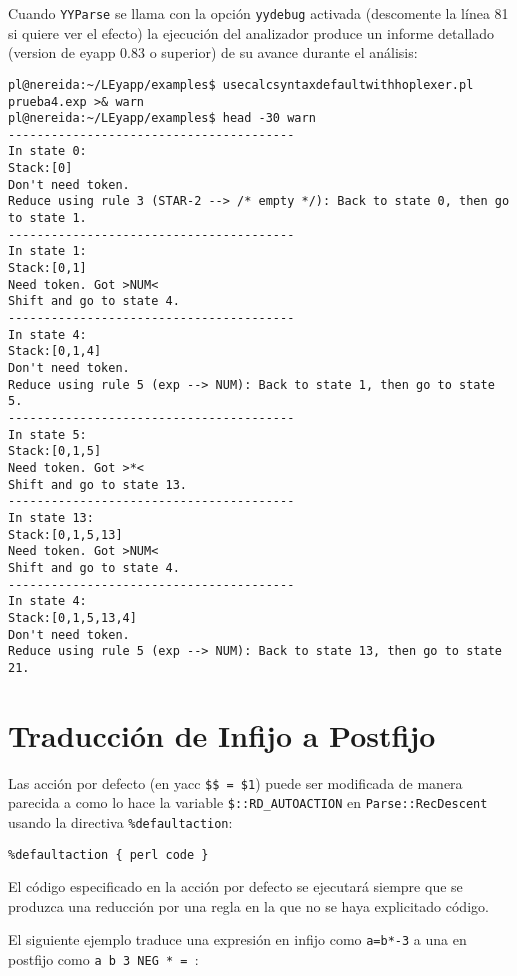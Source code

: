 
Cuando \verb|YYParse| se llama con la opción \verb|yydebug| activada 
(descomente la línea 81 si quiere ver el efecto) la ejecución
del analizador produce un informe detallado (version de eyapp 0.83 o superior)
de su avance durante el análisis:

\begin{verbatim}
pl@nereida:~/LEyapp/examples$ usecalcsyntaxdefaultwithhoplexer.pl prueba4.exp >& warn
pl@nereida:~/LEyapp/examples$ head -30 warn
----------------------------------------
In state 0:
Stack:[0]
Don't need token.
Reduce using rule 3 (STAR-2 --> /* empty */): Back to state 0, then go to state 1.
----------------------------------------
In state 1:
Stack:[0,1]
Need token. Got >NUM<
Shift and go to state 4.
----------------------------------------
In state 4:
Stack:[0,1,4]
Don't need token.
Reduce using rule 5 (exp --> NUM): Back to state 1, then go to state 5.
----------------------------------------
In state 5:
Stack:[0,1,5]
Need token. Got >*<
Shift and go to state 13.
----------------------------------------
In state 13:
Stack:[0,1,5,13]
Need token. Got >NUM<
Shift and go to state 4.
----------------------------------------
In state 4:
Stack:[0,1,5,13,4]
Don't need token.
Reduce using rule 5 (exp --> NUM): Back to state 13, then go to state 21.
\end{verbatim}

\section{Traducción de Infijo a Postfijo}

Las acción por defecto (en yacc \verb|$$ = $1|) puede ser modificada
de manera parecida a como lo hace la variable \verb|$::RD_AUTOACTION| en
\verb|Parse::RecDescent| usando la directiva \verb|%defaultaction|:

\begin{verbatim}
%defaultaction { perl code }
\end{verbatim}

El código especificado en la acción por defecto
se ejecutará siempre que se produzca una reducción 
por una regla en la que no se haya explicitado
código.

El siguiente ejemplo traduce una expresión en infijo
como \verb|a=b*-3| a una en postfijo como \verb|a b 3 NEG * = |:

